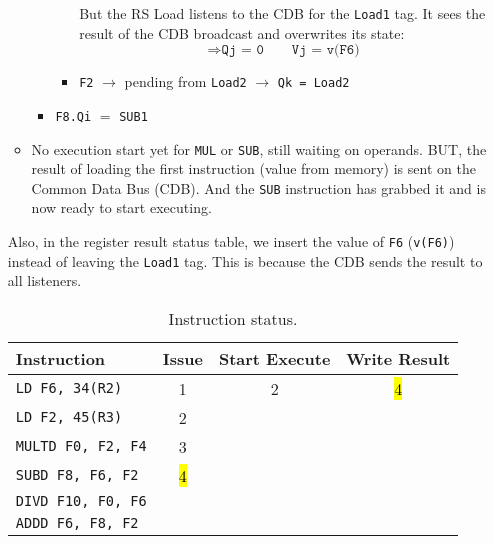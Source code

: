 \begin{enumerate}
\begin{itemize}
\begin{itemize}
\begin{itemize}
                But the RS Load listens to the CDB for the \texttt{Load1} tag. It sees the result of the CDB broadcast and overwrites its state:
                \begin{equation*}
                    \Rightarrow \texttt{Qj = 0} \hspace{2em} \texttt{Vj = v(F6)}
                \end{equation*}
                \item \texttt{F2} $\rightarrow$ pending from \texttt{Load2} $\rightarrow$ \texttt{Qk = Load2}
            \end{itemize}
            \item \texttt{F8.Qi} $=$ \texttt{SUB1}
        \end{itemize}
        \item No execution start yet for \texttt{MUL} or \texttt{SUB}, still waiting on operands. BUT, the result of loading the first instruction (value from memory) is sent on the Common Data Bus (CDB). And the \texttt{SUB} instruction has grabbed it and is now ready to start executing.
    \end{itemize}
    Also, in the register result status table, we insert the value of \texttt{F6} (\texttt{v(F6)}) instead of leaving the \texttt{Load1} tag. This is because the CDB sends the result to all listeners.

    \begin{table}[!htp]
        \centering
        \begin{tabular}{@{} l | c c c @{}}
            \toprule
            Instruction                 & Issue & Start Execute & Write Result  \\
            \midrule
            \texttt{LD    F6, 34(R2)}   & 1     & 2             & \hl{4}        \\ [.3em]
            \texttt{LD    F2, 45(R3)}   & 2     &               &               \\ [.3em]
            \texttt{MULTD F0, F2, F4}   & 3     &               &               \\ [.3em]
            \texttt{SUBD  F8, F6, F2}   &\hl{4} &               &               \\ [.3em]
            \texttt{DIVD  F10, F0, F6}  &       &               &               \\ [.3em]
            \texttt{ADDD  F6, F8, F2}   &       &               &               \\
            \bottomrule
        \end{tabular}
        \caption*{Instruction status.}
    \end{table}


\end{enumerate}
